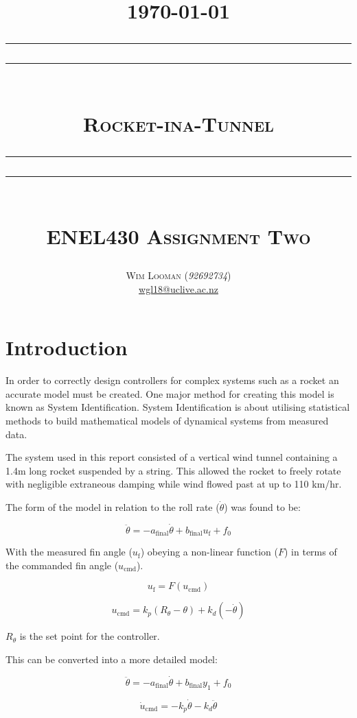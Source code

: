 \documentclass[a4paper,12pt]{article}
\title{
  \centering
  \flushright\footnotesize\today\\
  \centering
  \rule{\textwidth}{1.6pt}\vspace*{-\baselineskip}\vspace*{2pt}
  \rule{\textwidth}{0.4pt}\\[\baselineskip]
  {\Huge \scshape
    Rocket-ina-Tunnel\\[10pt]
  }
  \rule{\textwidth}{0.4pt}\vspace*{-\baselineskip}\vspace*{3.2pt}
  \rule{\textwidth}{1.6pt}\\[0.5\baselineskip]
  {\scshape \large
    ENEL430 Assignment Two\\
  }
}
\author{
  \vspace*{0.5\baselineskip}
  {\Large
    {\scshape Wim Looman} (\emph{92692734})\\
    \href{mailto:wgl18@uclive.ac.nz}{wgl18@uclive.ac.nz}\\
  }
}
\date{}
\begin{document}
  \maketitle

  \section{Introduction}

    In order to correctly design controllers for complex systems such as a
    rocket an accurate model must be created.  One major method for creating
    this model is known as System Identification.  System Identification is
    about utilising statistical methods to build mathematical models of
    dynamical systems from measured data.

    The system used in this report consisted of a vertical wind tunnel
    containing a 1.4m long rocket suspended by a string.  This allowed the
    rocket to freely rotate with negligible extraneous damping while wind flowed
    past at up to 110 km/hr.

    The form of the model in relation to the roll rate ($\dot\theta$) was found to be:

    \begin{equation}
      \ddot\theta = -a_\text{final}\dot\theta + b_\text{final} u_\text{f} + f_0
    \end{equation}

    With the measured fin angle ($u_\text{f}$) obeying a non-linear function ($F$) in
    terms of the commanded fin angle ($u_\text{cmd}$).

    \begin{equation}
      u_\text{f} = F\left(u_\text{cmd}\right)
    \end{equation}

    \begin{equation}
      u_\text{cmd} = k_p \left(R_\theta - \theta\right) + k_d \left(-\dot\theta\right)
    \end{equation}

    $R_\theta$ is the set point for the controller.

    This can be converted into a more detailed model:

    \begin{equation}
      \ddot\theta = -a_\text{final}\dot\theta + b_\text{final} y_1 + f_0
    \end{equation}

    \begin{equation}
      \dot u_\text{cmd} = -k_p \dot\theta - k_d \ddot\theta
    \end{equation}
\end{document}
